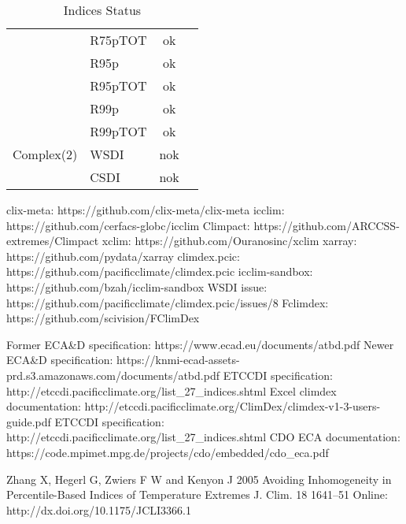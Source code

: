 \documentclass[a4paper,11pt]{article}
\begin{document}
\begin{table}[h]
\begin{tabular}{l l c c}
                     &  R75pTOT  &   ok             &                       \\
                     &  R95p     &   ok             &                       \\
                     &  R95pTOT  &   ok             &                       \\
                     &  R99p     &   ok             &                       \\
                     &  R99pTOT  &   ok             &                       \\
        Complex(2)   &  WSDI     &   nok            &                       \\
                     &  CSDI     &   nok            &                       \\
    \end{tabular}
    \label{table/indices_status}
    \caption{Indices Status}
    \end{table}

\clearpage
\begin{thebibliography}{1}
        clix-meta: https://github.com/clix-meta/clix-meta
        icclim: https://github.com/cerfacs-globc/icclim
        Climpact: https://github.com/ARCCSS-extremes/Climpact
        xclim: https://github.com/Ouranosinc/xclim
        xarray: https://github.com/pydata/xarray
        climdex.pcic: https://github.com/pacificclimate/climdex.pcic    
        icclim-sandbox: https://github.com/bzah/icclim-sandbox
        WSDI issue: https://github.com/pacificclimate/climdex.pcic/issues/8
        Fclimdex: https://github.com/scivision/FClimDex
        
        Former ECA\&D specification: https://www.ecad.eu/documents/atbd.pdf
        Newer ECA\&D specification: https://knmi-ecad-assets-prd.s3.amazonaws.com/documents/atbd.pdf
        ETCCDI specification: http://etccdi.pacificclimate.org/list\_27\_indices.shtml
        Excel climdex documentation: http://etccdi.pacificclimate.org/ClimDex/climdex-v1-3-users-guide.pdf
        ETCCDI specification: http://etccdi.pacificclimate.org/list\_27\_indices.shtml
        CDO ECA documentation: https://code.mpimet.mpg.de/projects/cdo/embedded/cdo\_eca.pdf

        Zhang X, Hegerl G, Zwiers F W and Kenyon J 2005 Avoiding Inhomogeneity in Percentile-Based Indices of Temperature Extremes J. Clim. 18 1641–51 Online: http://dx.doi.org/10.1175/JCLI3366.1
\end{thebibliography}
\end{document}
